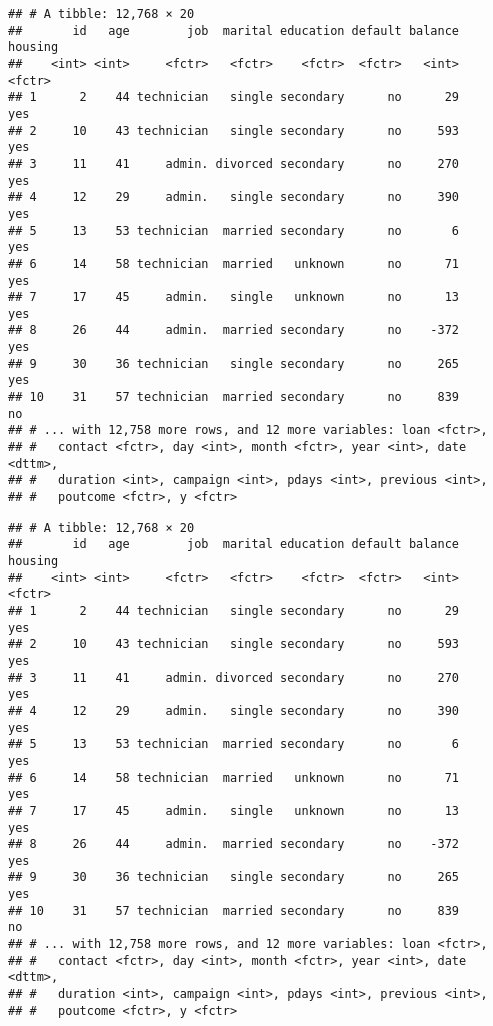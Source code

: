 \documentclass[]{book}
\newenvironment{Shaded}{\begin{snugshade}}{\end{snugshade}}
\newcommand{\KeywordTok}[1]{\textcolor[rgb]{0.13,0.29,0.53}{\textbf{{#1}}}}
\newcommand{\StringTok}[1]{\textcolor[rgb]{0.31,0.60,0.02}{{#1}}}
\newcommand{\CommentTok}[1]{\textcolor[rgb]{0.56,0.35,0.01}{\textit{{#1}}}}
\newcommand{\NormalTok}[1]{{#1}}
\begin{document}
\begin{verbatim}
## # A tibble: 12,768 × 20
##       id   age        job  marital education default balance housing
##    <int> <int>     <fctr>   <fctr>    <fctr>  <fctr>   <int>  <fctr>
## 1      2    44 technician   single secondary      no      29     yes
## 2     10    43 technician   single secondary      no     593     yes
## 3     11    41     admin. divorced secondary      no     270     yes
## 4     12    29     admin.   single secondary      no     390     yes
## 5     13    53 technician  married secondary      no       6     yes
## 6     14    58 technician  married   unknown      no      71     yes
## 7     17    45     admin.   single   unknown      no      13     yes
## 8     26    44     admin.  married secondary      no    -372     yes
## 9     30    36 technician   single secondary      no     265     yes
## 10    31    57 technician  married secondary      no     839      no
## # ... with 12,758 more rows, and 12 more variables: loan <fctr>,
## #   contact <fctr>, day <int>, month <fctr>, year <int>, date <dttm>,
## #   duration <int>, campaign <int>, pdays <int>, previous <int>,
## #   poutcome <fctr>, y <fctr>
\end{verbatim}

\begin{Shaded}
\end{Shaded}

\begin{verbatim}
## # A tibble: 12,768 × 20
##       id   age        job  marital education default balance housing
##    <int> <int>     <fctr>   <fctr>    <fctr>  <fctr>   <int>  <fctr>
## 1      2    44 technician   single secondary      no      29     yes
## 2     10    43 technician   single secondary      no     593     yes
## 3     11    41     admin. divorced secondary      no     270     yes
## 4     12    29     admin.   single secondary      no     390     yes
## 5     13    53 technician  married secondary      no       6     yes
## 6     14    58 technician  married   unknown      no      71     yes
## 7     17    45     admin.   single   unknown      no      13     yes
## 8     26    44     admin.  married secondary      no    -372     yes
## 9     30    36 technician   single secondary      no     265     yes
## 10    31    57 technician  married secondary      no     839      no
## # ... with 12,758 more rows, and 12 more variables: loan <fctr>,
## #   contact <fctr>, day <int>, month <fctr>, year <int>, date <dttm>,
## #   duration <int>, campaign <int>, pdays <int>, previous <int>,
## #   poutcome <fctr>, y <fctr>
\end{verbatim}
\end{document}
